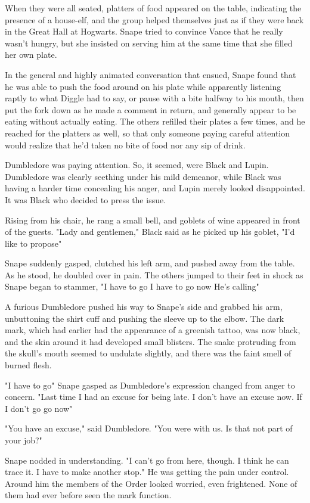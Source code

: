 When they were all seated, platters of food appeared on the table, indicating the presence of a house-elf, and the group helped themselves just as if they were back in the Great Hall at Hogwarts. Snape tried to convince Vance that he really wasn't hungry, but she insisted on serving him at the same time that she filled her own plate.

In the general and highly animated conversation that ensued, Snape found that he was able to push the food around on his plate while apparently listening raptly to what Diggle had to say, or pause with a bite halfway to his mouth, then put the fork down as he made a comment in return, and generally appear to be eating without actually eating. The others refilled their plates a few times, and he reached for the platters as well, so that only someone paying careful attention would realize that he'd taken no bite of food nor any sip of drink.

Dumbledore was paying attention. So, it seemed, were Black and Lupin. Dumbledore was clearly seething under his mild demeanor, while Black was having a harder time concealing his anger, and Lupin merely looked disappointed. It was Black who decided to press the issue.

Rising from his chair, he rang a small bell, and goblets of wine appeared in front of the guests. "Lady and gentlemen," Black said as he picked up his goblet, "I'd like to propose{\el}"

Snape suddenly gasped, clutched his left arm, and pushed away from the table. As he stood, he doubled over in pain. The others jumped to their feet in shock as Snape began to stammer, "I have to go{\el} I have to go now{\el} He's calling{\el}"

A furious Dumbledore pushed his way to Snape's side and grabbed his arm, unbuttoning the shirt cuff and pushing the sleeve up to the elbow. The dark mark, which had earlier had the appearance of a greenish tattoo, was now black, and the skin around it had developed small blisters. The snake protruding from the skull's mouth seemed to undulate slightly, and there was the faint smell of burned flesh.

"I have to go{\el}" Snape gasped as Dumbledore's expression changed from anger to concern. "Last time I had an excuse for being late. I don't have an excuse now. If I don't go{\el} go now{\el}"

"You have an excuse," said Dumbledore. "You were with us. Is that not part of your job?"

Snape nodded in understanding. "I can't go from here, though. I think he can trace it. I have to make another stop." He was getting the pain under control. Around him the members of the Order looked worried, even frightened. None of them had ever before seen the mark function.

